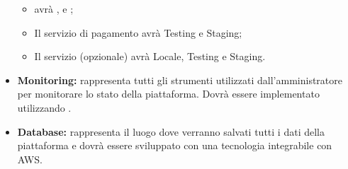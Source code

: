 \begin{itemize}
\begin{itemize}
        \item {} avrà ,  e ;
        \item Il servizio di pagamento avrà Testing e Staging;
        \item Il servizio  (opzionale) avrà Locale, Testing e Staging.
    \end{itemize}
    \item \textbf{Monitoring:} rappresenta tutti gli strumenti utilizzati dall'amministratore per monitorare lo stato della piattaforma. Dovrà essere implementato utilizzando .
    \item \textbf{Database:} rappresenta il luogo dove verranno salvati tutti i dati della piattaforma e dovrà essere sviluppato con una tecnologia integrabile con AWS.
\end{itemize}